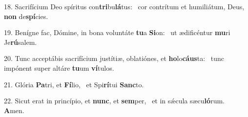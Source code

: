 18. Sacrifícium Deo spíritus con\textbf{tri}bu\textbf{lá}tus: \ast\  cor contrítum et humiliátum, Deus, \textbf{non} de\textbf{spí}cies.\

19. Benígne fac, Dómine, in bona voluntáte \textbf{tu}a \textbf{Si}on: \ast\  ut ædificéntur \textbf{mu}ri Je\textbf{rú}salem.\

20. Tunc acceptábis sacrifícium justítiæ, oblatiónes, et \textbf{ho}lo\textbf{cáus}ta: \ast\  tunc impónent super altáre \textbf{tu}um \textbf{ví}tulos.\

21. Glória \textbf{Pa}tri, et \textbf{Fí}lio, \ast\  et Spi\textbf{rí}tui \textbf{Sanc}to.\

22. Sicut erat in princípio, et \textbf{nunc}, et \textbf{sem}per, \ast\  et in sǽcula sæcu\textbf{ló}rum. \textbf{A}men.\

